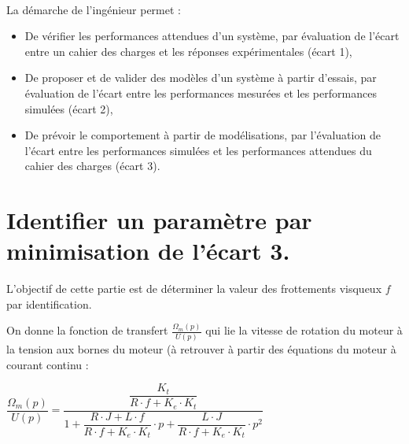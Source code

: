 

 \\

\graphicspath{{../../../img/}}
\begin{center}
\def\svgwidth{\columnwidth}

\end{center}

La démarche de l’ingénieur permet :
\begin{itemize}
 \item De vérifier les performances attendues d’un système, par évaluation de l’écart entre un cahier des charges et les réponses expérimentales (écart 1),
 \item De proposer et de valider des modèles d’un système à partir d’essais, par évaluation de l’écart entre les performances mesurées et les performances simulées (écart 2),
 \item De prévoir le comportement à partir de modélisations, par l’évaluation de l’écart entre les performances simulées et les performances attendues du cahier des charges (écart 3).
\end{itemize}

\newpage

\newpage

\section{Identifier un paramètre par minimisation de l'écart 3.}

L'objectif de cette partie est de déterminer la valeur des frottements visqueux $f$ par identification.

On donne la fonction de transfert $\frac{\Omega_m(p)}{U(p)}$ qui lie la vitesse de rotation du moteur à la tension aux bornes du moteur (à retrouver à partir des équations du moteur à courant continu :
\begin{center}
 $\dfrac{\Omega_m(p)}{U(p)}=\dfrac{\dfrac{K_t}{R\cdot f +K_e\cdot K_t}}{1+\dfrac{R\cdot J+L\cdot f}{R\cdot f +K_e\cdot K_t}\cdot p+\dfrac{L\cdot J}{R\cdot f +K_e\cdot K_t}\cdot p^2}$
\end{center}

